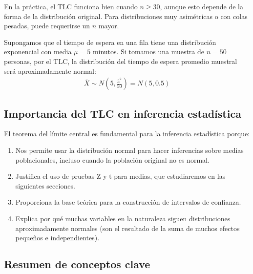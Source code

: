 \begin{observacion}
	En la práctica, el TLC funciona bien cuando $n \geq 30$, aunque esto depende de la forma de la distribución original. Para distribuciones muy asimétricas o con colas pesadas, puede requerirse un $n$ mayor.
\end{observacion}

\begin{ejemplo}
	\label{exmp:5.1.3}
	Supongamos que el tiempo de espera en una fila tiene una distribución exponencial con media $\mu = 5$ minutos. Si tomamos una muestra de $n = 50$ personas, por el TLC, la distribución del tiempo de espera promedio muestral será aproximadamente normal:
	\begin{align}
		\bar{X} \sim N\left(5, \frac{5^2}{50}\right) = N(5, 0.5)
	\end{align}
\end{ejemplo}

\subsection*{Importancia del TLC en inferencia estadística}

El teorema del límite central es fundamental para la inferencia estadística porque:

\begin{enumerate}
	\item Nos permite usar la distribución normal para hacer inferencias sobre medias poblacionales, incluso cuando la población original no es normal.
	
	\item Justifica el uso de pruebas Z y t para medias, que estudiaremos en las siguientes secciones.
	
	\item Proporciona la base teórica para la construcción de intervalos de confianza.
	
	\item Explica por qué muchas variables en la naturaleza siguen distribuciones aproximadamente normales (son el resultado de la suma de muchos efectos pequeños e independientes).
\end{enumerate}

\subsection*{Resumen de conceptos clave}

